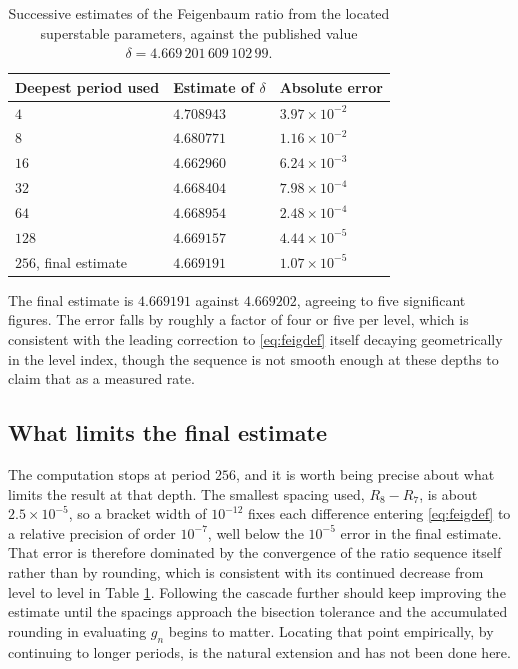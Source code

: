 \documentclass[11pt,a4paper]{article}
\theoremstyle{definition}
\theoremstyle{remark}
\begin{document}
\begin{table}[H]
\centering
\begin{tabular}{lll}
\toprule
Deepest period used & Estimate of $\delta$ & Absolute error \\
\midrule
$4$   & $4.708943$ & $3.97\times10^{-2}$ \\
$8$   & $4.680771$ & $1.16\times10^{-2}$ \\
$16$  & $4.662960$ & $6.24\times10^{-3}$ \\
$32$  & $4.668404$ & $7.98\times10^{-4}$ \\
$64$  & $4.668954$ & $2.48\times10^{-4}$ \\
$128$ & $4.669157$ & $4.44\times10^{-5}$ \\
\midrule
$256$, final estimate & $4.669191$ & $1.07\times10^{-5}$ \\
\bottomrule
\end{tabular}
\caption{Successive estimates of the Feigenbaum ratio from the located
superstable parameters, against the published value
$\delta = 4.669\,201\,609\,102\,99$.}
\label{tab:feigenbaum}
\end{table}

The final estimate is $4.669191$ against $4.669202$, agreeing to five
significant figures. The error falls by roughly a factor of four or five per
level, which is consistent with the leading correction to \eqref{eq:feigdef}
itself decaying geometrically in the level index, though the sequence is not
smooth enough at these depths to claim that as a measured rate.

\subsection{What limits the final estimate}

The computation stops at period $256$, and it is worth being precise about
what limits the result at that depth. The smallest spacing used, $R_8-R_7$, is
about $2.5\times10^{-5}$, so a bracket width of $10^{-12}$ fixes each
difference entering \eqref{eq:feigdef} to a relative precision of order
$10^{-7}$, well below the $10^{-5}$ error in the final estimate. That error is
therefore dominated by the convergence of the ratio sequence itself rather
than by rounding, which is consistent with its continued decrease from level
to level in Table \ref{tab:feigenbaum}. Following the cascade further should
keep improving the estimate until the spacings approach the bisection
tolerance and the accumulated rounding in evaluating $g_n$ begins to matter.
Locating that point empirically, by continuing to longer periods, is the
natural extension and has not been done here.
\end{document}
